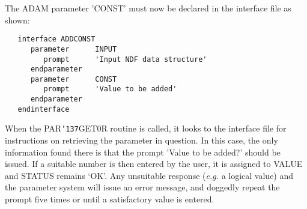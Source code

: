 \documentclass[twoside,11pt]{article}
\renewcommand{\_}{{\tt\char'137}}
\begin{document}
The ADAM parameter 'CONST' must now be declared in the interface file as
shown:
\begin{verbatim}
   interface ADDCONST
      parameter      INPUT
         prompt      'Input NDF data structure'
      endparameter
      parameter      CONST
         prompt      'Value to be added'
      endparameter
   endinterface
\end{verbatim}
When the PAR\_GET0R routine is called, it looks to the interface file
for instructions on retrieving the parameter in question.
In this case, the only information found there is that the
prompt 'Value to be added?' should be issued.
If a suitable number is then entered by the user, it is assigned to VALUE
and STATUS remains `OK'.
Any unsuitable response ({\it e.g.} a logical value) and the parameter
system will
issue an error message, and doggedly repeat the prompt five times or until
a satisfactory value is entered.
\end{document}
